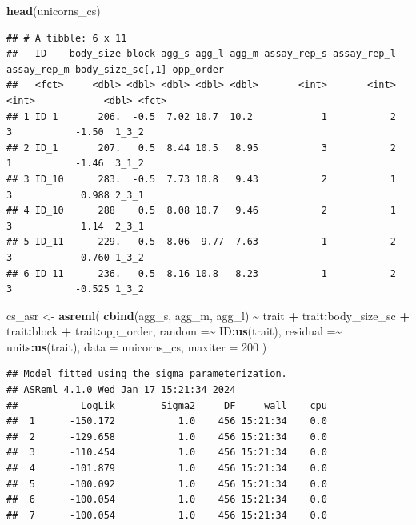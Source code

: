 \documentclass[
  12pt,
]{book}
\newenvironment{Shaded}{\begin{snugshade}}{\end{snugshade}}
\newcommand{\DataTypeTok}[1]{\textcolor[rgb]{0.13,0.29,0.53}{#1}}
\newcommand{\DecValTok}[1]{\textcolor[rgb]{0.00,0.00,0.81}{#1}}
\newcommand{\KeywordTok}[1]{\textcolor[rgb]{0.13,0.29,0.53}{\textbf{#1}}}
\newcommand{\NormalTok}[1]{#1}
\newcommand{\OperatorTok}[1]{\textcolor[rgb]{0.81,0.36,0.00}{\textbf{#1}}}
\newcommand{\StringTok}[1]{\textcolor[rgb]{0.31,0.60,0.02}{#1}}
\begin{document}
\begin{Shaded}
\begin{Highlighting}[]
\KeywordTok{head}\NormalTok{(unicorns\_cs)}
\end{Highlighting}
\end{Shaded}

\begin{verbatim}
## # A tibble: 6 x 11
##   ID    body_size block agg_s agg_l agg_m assay_rep_s assay_rep_l assay_rep_m body_size_sc[,1] opp_order
##   <fct>     <dbl> <dbl> <dbl> <dbl> <dbl>       <int>       <int>       <int>            <dbl> <fct>    
## 1 ID_1       206.  -0.5  7.02 10.7  10.2            1           2           3           -1.50  1_3_2    
## 2 ID_1       207.   0.5  8.44 10.5   8.95           3           2           1           -1.46  3_1_2    
## 3 ID_10      283.  -0.5  7.73 10.8   9.43           2           1           3            0.988 2_3_1    
## 4 ID_10      288    0.5  8.08 10.7   9.46           2           1           3            1.14  2_3_1    
## 5 ID_11      229.  -0.5  8.06  9.77  7.63           1           2           3           -0.760 1_3_2    
## 6 ID_11      236.   0.5  8.16 10.8   8.23           1           2           3           -0.525 1_3_2
\end{verbatim}

\begin{Shaded}
\begin{Highlighting}[]
\NormalTok{cs\_asr \textless{}{-}}\StringTok{ }\KeywordTok{asreml}\NormalTok{(}
  \KeywordTok{cbind}\NormalTok{(agg\_s, agg\_m, agg\_l) }\OperatorTok{\textasciitilde{}}\StringTok{ }\NormalTok{trait }\OperatorTok{+}\StringTok{ }\NormalTok{trait}\OperatorTok{:}\NormalTok{body\_size\_sc }\OperatorTok{+}
\StringTok{    }\NormalTok{trait}\OperatorTok{:}\NormalTok{block }\OperatorTok{+}
\StringTok{    }\NormalTok{trait}\OperatorTok{:}\NormalTok{opp\_order,}
  \DataTypeTok{random =}\OperatorTok{\textasciitilde{}}\StringTok{ }\NormalTok{ID}\OperatorTok{:}\KeywordTok{us}\NormalTok{(trait),}
  \DataTypeTok{residual =}\OperatorTok{\textasciitilde{}}\StringTok{ }\NormalTok{units}\OperatorTok{:}\KeywordTok{us}\NormalTok{(trait),}
  \DataTypeTok{data =}\NormalTok{ unicorns\_cs,}
  \DataTypeTok{maxiter =} \DecValTok{200}
\NormalTok{)}
\end{Highlighting}
\end{Shaded}

\begin{verbatim}
## Model fitted using the sigma parameterization.
## ASReml 4.1.0 Wed Jan 17 15:21:34 2024
##           LogLik        Sigma2     DF     wall    cpu
##  1      -150.172           1.0    456 15:21:34    0.0
##  2      -129.658           1.0    456 15:21:34    0.0
##  3      -110.454           1.0    456 15:21:34    0.0
##  4      -101.879           1.0    456 15:21:34    0.0
##  5      -100.092           1.0    456 15:21:34    0.0
##  6      -100.054           1.0    456 15:21:34    0.0
##  7      -100.054           1.0    456 15:21:34    0.0
\end{verbatim}
\end{document}
